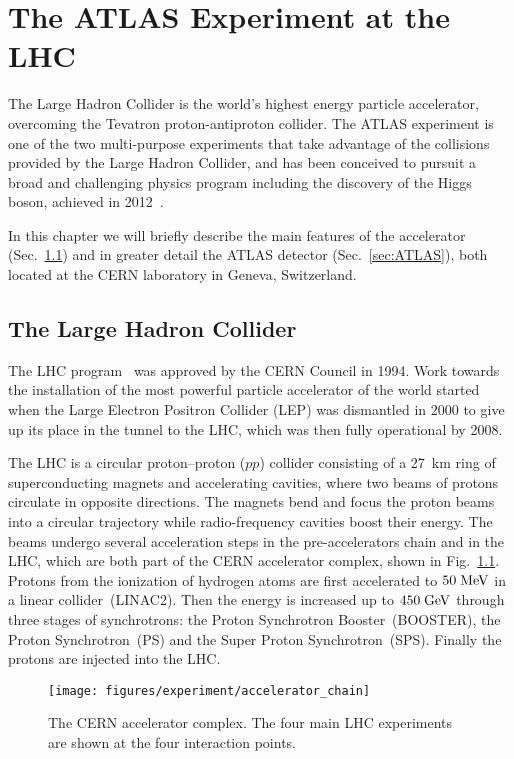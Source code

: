 \chapter{The ATLAS Experiment at the LHC}
\label{sec:experiment}

The Large Hadron Collider is the world's highest energy particle
accelerator, overcoming the Tevatron proton-antiproton collider. The
ATLAS experiment is one of the two multi-purpose experiments that take
advantage of the collisions provided by the Large Hadron Collider, and
has been conceived to pursuit a broad and challenging physics program
including the discovery of the Higgs boson, achieved in
2012~\cite{2012gk,Chatrchyan201230}.

In this chapter we will briefly describe the main features of 
the accelerator (Sec.~\ref{sec:LHC}) and in greater detail 
the ATLAS detector (Sec.~\ref{sec:ATLAS}), both located at the CERN
laboratory in Geneva, Switzerland.

\section{The Large Hadron Collider}
\label{sec:LHC}

The LHC program~\cite{LHCreport} was approved by the CERN Council in
1994. Work towards the installation of
the most powerful particle accelerator of the world started when the
Large Electron Positron Collider (LEP) was dismantled in 2000 to give
up its place in the tunnel to the LHC, which was then fully
operational by 2008.

The LHC is a circular proton--proton ($pp$) collider consisting of a
27~km ring of superconducting magnets and accelerating cavities, where
two beams of protons circulate in opposite directions. 
The magnets bend and focus the proton beams into a circular trajectory
while radio-frequency cavities boost their energy.
The beams undergo several acceleration steps in the pre-accelerators
chain and in the LHC, which are both part of the CERN accelerator
complex, shown in Fig.~\ref{fig:lhc}.
Protons from the ionization of hydrogen atoms are first accelerated to
\mbox{$50 \; \mathrm{MeV}$} in a linear collider~(LINAC2). Then the energy is
increased up to \mbox{$450 \; \mathrm{GeV}$} through three stages of
synchrotrons: the Proton Synchrotron Booster~(BOOSTER), the Proton
Synchrotron~(PS) and the Super Proton Synchrotron~(SPS).
Finally the protons are injected into the LHC.

\begin{figure}[ht]
\begin{center}
\texttt{[image: figures/experiment/accelerator\_chain]}
\caption[CERN Accelerator complex]{
  The CERN accelerator complex. The four main LHC experiments are
  shown at the four interaction points.}
\label{fig:lhc}
\end{center}
\end{figure}

